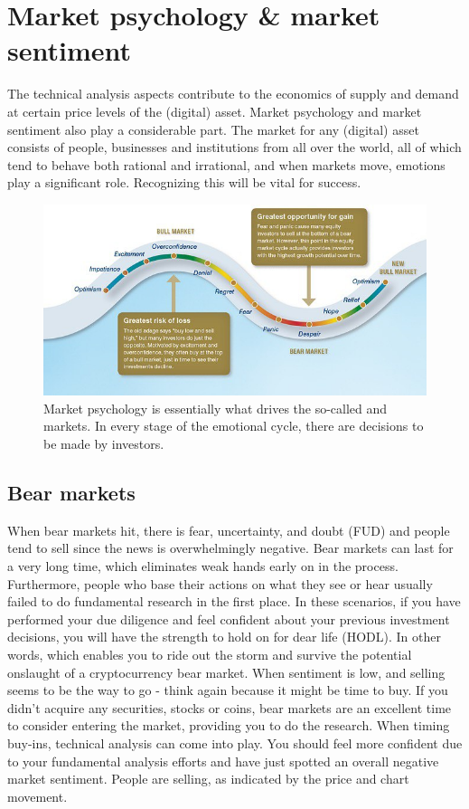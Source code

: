 \section{Market psychology \& market sentiment}
The technical analysis aspects contribute to the economics of supply and demand at certain price levels of the (digital) asset. Market psychology and market sentiment also play a considerable part. The market for any (digital) asset consists of people, businesses and institutions from all over the world, all of which tend to behave both rational and irrational, and when markets move, emotions play a significant role. Recognizing this will be vital for success.\medskip

\begin{figure}
    \centering
    \includegraphics[width=.95\textwidth]{img/ch-investing/bear_bullmarket.jpg}
    \caption[Bear and Bull Markets and Market Psychology]{Market psychology is essentially what drives the so-called  and  markets. In every stage of the emotional cycle, there are decisions to be made by investors.}
    \label{fig:bear_bullmarket}
\end{figure}

\medskip

\subsection{Bear markets}
When bear markets hit, there is fear, uncertainty, and doubt (FUD) and people tend to sell since the news is overwhelmingly negative. Bear markets can last for a very long time, which eliminates weak hands early on in the process. Furthermore, people who base their actions on what they see or hear usually failed to do fundamental research in the first place. In these scenarios, if you have performed your due diligence and feel confident about your previous investment decisions, you will have the strength to hold on for dear life (HODL). In other words, which enables you to ride out the storm and survive the potential onslaught of a cryptocurrency bear market. When sentiment is low, and selling seems to be the way to go - think again because it might be time to buy. If you didn't acquire any securities, stocks or coins, bear markets are an excellent time to consider entering the market, providing you to do the research. When timing buy-ins, technical analysis can come into play. You should feel more confident due to your fundamental analysis efforts and have just spotted an overall negative market sentiment. People are selling, as indicated by the price and chart movement.\medskip

